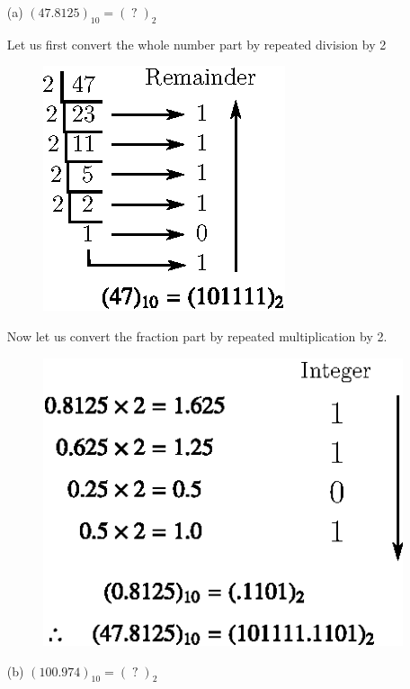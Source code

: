 \begin{solution}
\begin{itemize}
\item[(a)] $(47.8125)_{10}=(\;?\;)_{2}$

Let us first convert the whole number part by repeated division by 2
\begin{figure}[H]
\centering
\includegraphics[scale=1.1]{chap6/fig3.eps}
\end{figure}

Now let us convert the fraction part by repeated multiplication by 2.
\begin{figure}[H]
\centering
\includegraphics{chap6/fig4.eps}
\end{figure}

\item[(b)] $(100.974)_{10}=(\;?\;)_{2}$


\end{itemize}
\end{solution}
